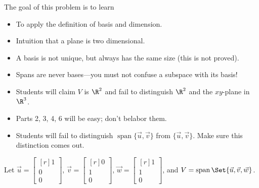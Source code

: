 \documentclass{problemset}
\DeclareMathOperator{\Span}{span}
\newcommand{\mat}[1]{\begin{bmatrix*}[r]#1\end{bmatrix*}}
\begin{document}
	\question
	\begin{annotation}
		\begin{goals}

			The goal of this problem is to learn
			\begin{itemize}
				\item To apply the definition of basis and dimension.
				\item Intuition that a plane is two dimensional.
				\item A basis is not unique, but always has the same size (this is not proved).
				\item Spans are never bases---you must not confuse a subspace with its basis!
			\end{itemize}
		\end{goals}

		\begin{notes}
			\begin{itemize}
				\item Students will claim $V$ is $\R^2$ and fail to distinguish
					$\R^2$ and the $xy$-plane in $\R^3$.
				\item Parts 2, 3, 4, 6 will be easy; don't belabor them.
				\item Students will fail to distinguish $\Span\{\vec u,\vec v\}$
					from $\{\vec u,\vec v\}$. Make sure this distinction comes out.
			\end{itemize}
		\end{notes}
	\end{annotation}
	Let $\vec u=\mat{1\\0\\0}$, $\vec v=\mat{0\\1\\0}$, $\vec w=\mat{1\\1\\0}$,
	and $V=\Span\Set{\vec u,\vec v,\vec w}$.
\end{document}
